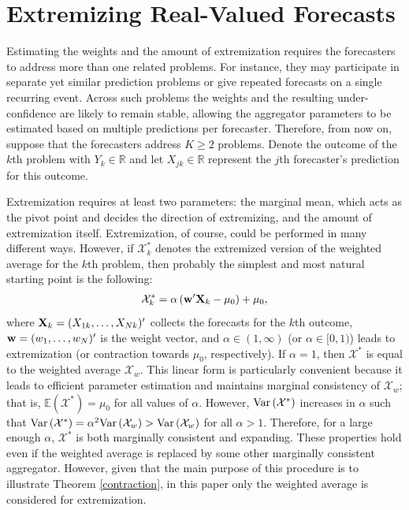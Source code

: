 \documentclass[11pt]{article}
\newcommand{\E}{\mathbb{E}}
\theoremstyle{definition}
\theoremstyle{definition}
\def\w{{\bf w}}
\def\X{{\bf X}}
\def\E{{\mathbb E}}
\def\Var{{\rm Var}\,}
\begin{document}
\section{Extremizing Real-Valued Forecasts} \label{extremization}


Estimating the weights and the amount of extremization requires the forecasters to address more than one related problems. For instance, they may participate in separate yet similar prediction problems or give repeated forecasts on a single recurring event. Across such problems the weights and the resulting under-confidence are likely to remain stable, allowing the aggregator parameters to be estimated based on multiple predictions per forecaster. Therefore, from now on, suppose that the forecasters address $K \geq 2$ problems. Denote the outcome of the $k$th problem with $Y_k \in \mathbb{R}$ and let $X_{jk} \in \mathbb{R}$ represent the $j$th forecaster's prediction for this outcome. 



Extremization requires at least two parameters: the marginal mean, which acts as the pivot point and decides the direction of extremizing, and the amount of extremization itself. Extremization, of course, could be performed in many different ways. However, if $\mathcal{X}_k^*$ denotes the extremized version of the weighted average for the $k$th problem, then probably the simplest and most natural starting point is the following:
\begin{align*}
\mathcal{X}_k^* = \alpha  \left(  \w'\X_{k} - \mu_0\right) + \mu_0,
\end{align*}
 where $\X_k = (X_{1k}, \dots, X_{Nk})'$ collects the forecasts for the $k$th outcome, $\w = (w_1, \dots, w_N)'$ is the weight vector, and $\alpha \in (1, \infty)$ (or $\alpha \in [0, 1)$) leads to extremization (or contraction towards $\mu_0$, respectively). If $\alpha = 1$, then $\mathcal{X}^*$ is equal to the weighted average $\mathcal{X}_w$.  This linear form is particularly convenient because it leads to efficient parameter estimation and maintains marginal consistency of $\mathcal{X}_w$; that is, $\E(\mathcal{X}^*) = \mu_0$ for all values of $\alpha$.  However, $\Var(\mathcal{X}^*)$ increases in $\alpha$ such that $\Var(\mathcal{X}^*) = \alpha^2 \Var(\mathcal{X}_w) > \Var(\mathcal{X}_w)$ for all $\alpha > 1$. Therefore, for a large enough $\alpha$, $\mathcal{X}^*$ is both marginally consistent and expanding. These properties hold even if the weighted average is replaced by some other marginally consistent aggregator. However, given that the main purpose of this procedure is to illustrate Theorem \ref{contraction}, in this paper only the weighted average is considered for extremization.
\end{document}
